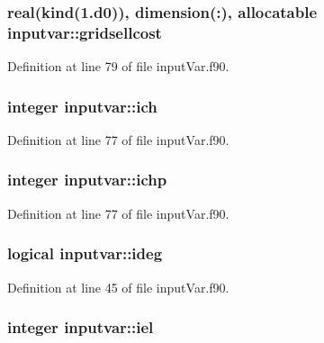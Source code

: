 \hypertarget{classinputvar_a4c5f410c351c402a40ef3236195008e7}{
\subsubsection[{gridsellcost}]{\setlength{\rightskip}{0pt plus 5cm}real(kind(1.d0)), dimension(\-:), allocatable inputvar\-::gridsellcost}}\label{classinputvar_a4c5f410c351c402a40ef3236195008e7}


Definition at line 79 of file input\-Var.\-f90.

\hypertarget{classinputvar_a69cdcc78492d1a96e3f02ee2915f207d}{
\subsubsection[{ich}]{\setlength{\rightskip}{0pt plus 5cm}integer inputvar\-::ich}}\label{classinputvar_a69cdcc78492d1a96e3f02ee2915f207d}


Definition at line 77 of file input\-Var.\-f90.

\hypertarget{classinputvar_af57151a30c510558682b98e1b72d844b}{
\subsubsection[{ichp}]{\setlength{\rightskip}{0pt plus 5cm}integer inputvar\-::ichp}}\label{classinputvar_af57151a30c510558682b98e1b72d844b}


Definition at line 77 of file input\-Var.\-f90.

\hypertarget{classinputvar_a62235e6c8b16a98c1aea10ac01e11ac9}{
\subsubsection[{ideg}]{\setlength{\rightskip}{0pt plus 5cm}logical inputvar\-::ideg}}\label{classinputvar_a62235e6c8b16a98c1aea10ac01e11ac9}


Definition at line 45 of file input\-Var.\-f90.

\hypertarget{classinputvar_a6f9a3a8beea8f6e1aa8140bab654a48f}{
\subsubsection[{iel}]{\setlength{\rightskip}{0pt plus 5cm}integer inputvar\-::iel}}\label{classinputvar_a6f9a3a8beea8f6e1aa8140bab654a48f}


